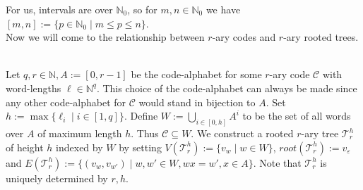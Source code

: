 \documentclass[12pt]{article}
\newcommand{\T}[0]{{\mathcal{T}_r^h}}
\newcommand{\ro}[0]{\textit{root}}
\newenvironment{statement3}[3]{\begin{trivlist}
\item[\hskip \labelsep {\bfseries #1}\hskip \labelsep {\bfseries #2} {#3}\textbf{.}]}{\end{trivlist}}
\begin{document}
For us, intervals are over $\mathbb{N}_0$, so for $m,n \in \mathbb{N}_0$ we have $[m,n] := \{p \in \mathbb{N}_0 \mid
m \leq p \leq n\}$.\\
Now we will come to the relationship between $r$-ary codes and $r$-ary rooted trees.

\begin{statement3}{(1.4)}{Definition}{(r-ary Trees from r-ary Codes)}\strut\\[2pt]
    Let $q,r \in \mathbb{N}, A := [0,r-1]$ be the code-alphabet for some $r$-ary code $\mathcal{C}$ with word-lengths
    $\ell \in \mathbb{N}^q$. This choice of the code-alphabet can always be made since any other code-alphabet
    for $\mathcal{C}$ would stand in bijection to $A$.
    Set $h := \max\{\ell_i \mid i \in [1,q]\}$.
    Define $W := \bigcup_{i \in [0,h]} A^i$ to be the set of all words over $A$ of maximum length $h$. Thus
    $\mathcal{C} \subseteq W$. We construct a rooted $r$-ary tree $\T$ of height $h$ indexed by $W$ by setting
    $V(\T) := \{v_w \mid w \in W\}$, $\ro(\T) := v_\varepsilon$ and
    $E(\T) := \{(v_w,v_{w'}) \mid w,w' \in W, wx = w', x\in A\}$. Note that $\T$ is uniquely determined by $r,h$.
\end{statement3}
\end{document}
